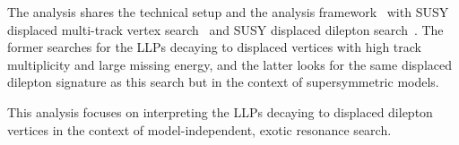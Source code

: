 The analysis shares the technical setup and the analysis framework~\cite{SUSYAnalysisFramework} with SUSY displaced multi-track vertex search~\cite{Duarte-Campderros:2152010} and SUSY displaced dilepton search~\cite{}. The former searches for the LLPs decaying to displaced vertices with high track multiplicity and large missing energy, and the latter looks for the same displaced dilepton signature as this search but in the context of supersymmetric models. 

This analysis focuses on interpreting the LLPs decaying to displaced dilepton vertices in the context of model-independent, exotic resonance search.

